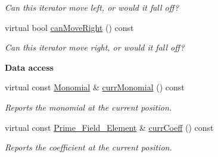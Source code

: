 \begin{Indent}
\begin{DoxyCompactItemize}
\begin{DoxyCompactList}\small\item\em Can this iterator move left, or would it fall off? \end{DoxyCompactList}\item 
\mbox{\label{class_d_b___polynomial___iterator_aee1c98138de206687f42340fd95c80c1}} 
virtual bool \hyperlink{class_d_b___polynomial___iterator_aee1c98138de206687f42340fd95c80c1}{can\+Move\+Right} () const
\begin{DoxyCompactList}\small\item\em Can this iterator move right, or would it fall off? \end{DoxyCompactList}\end{DoxyCompactItemize}
\end{Indent}
\begin{Indent}\textbf{ Data access}\par
\begin{DoxyCompactItemize}
\item 
\mbox{\label{class_d_b___polynomial___iterator_a4c228e6584102ba45871aab61cf26693}} 
virtual const \hyperlink{class_monomial}{Monomial} \& \hyperlink{class_d_b___polynomial___iterator_a4c228e6584102ba45871aab61cf26693}{curr\+Monomial} () const
\begin{DoxyCompactList}\small\item\em Reports the monomial at the current position. \end{DoxyCompactList}\item 
\mbox{\label{class_d_b___polynomial___iterator_a31906b096e4fa7eac4b6488f4a10f48f}} 
virtual const \hyperlink{class_prime___field___element}{Prime\+\_\+\+Field\+\_\+\+Element} \& \hyperlink{class_d_b___polynomial___iterator_a31906b096e4fa7eac4b6488f4a10f48f}{curr\+Coeff} () const
\begin{DoxyCompactList}\small\item\em Reports the coefficient at the current position. \end{DoxyCompactList}\end{DoxyCompactItemize}
\end{Indent}
